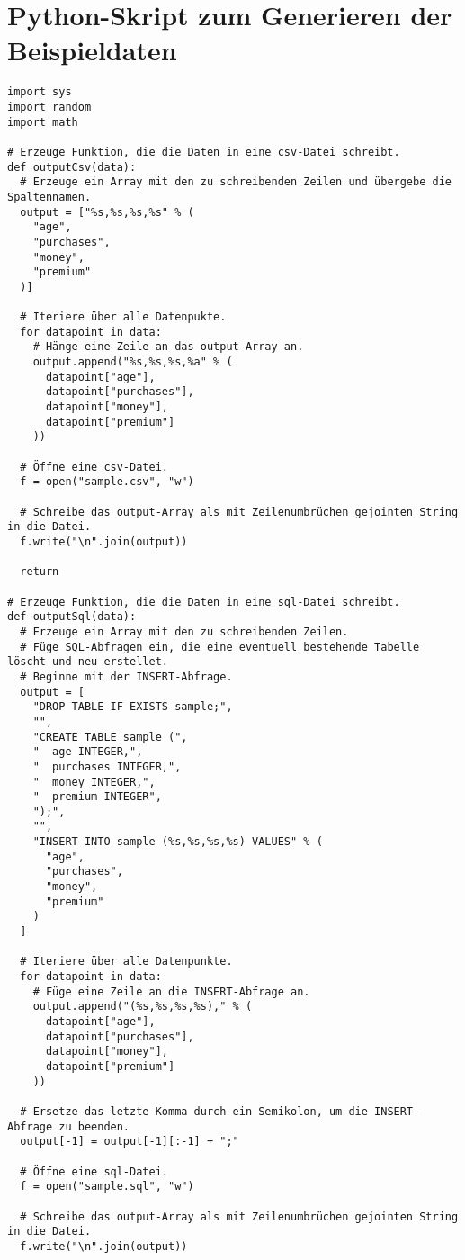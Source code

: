 \chapter{Python-Skript zum Generieren der Beispieldaten}
\label{appendix:A}

\begin{verbatim}
import sys
import random
import math

# Erzeuge Funktion, die die Daten in eine csv-Datei schreibt.
def outputCsv(data):
  # Erzeuge ein Array mit den zu schreibenden Zeilen und übergebe die Spaltennamen.
  output = ["%s,%s,%s,%s" % (
    "age",
    "purchases",
    "money",
    "premium"
  )]

  # Iteriere über alle Datenpukte.
  for datapoint in data:
    # Hänge eine Zeile an das output-Array an.
    output.append("%s,%s,%s,%a" % (
      datapoint["age"],
      datapoint["purchases"],
      datapoint["money"],
      datapoint["premium"]
    ))

  # Öffne eine csv-Datei.
  f = open("sample.csv", "w")

  # Schreibe das output-Array als mit Zeilenumbrüchen gejointen String in die Datei.
  f.write("\n".join(output))

  return

# Erzeuge Funktion, die die Daten in eine sql-Datei schreibt.
def outputSql(data):
  # Erzeuge ein Array mit den zu schreibenden Zeilen.
  # Füge SQL-Abfragen ein, die eine eventuell bestehende Tabelle löscht und neu erstellet.
  # Beginne mit der INSERT-Abfrage.
  output = [
    "DROP TABLE IF EXISTS sample;",
    "",
    "CREATE TABLE sample (",
    "  age INTEGER,",
    "  purchases INTEGER,",
    "  money INTEGER,",
    "  premium INTEGER",
    ");",
    "",
    "INSERT INTO sample (%s,%s,%s,%s) VALUES" % (
      "age",
      "purchases",
      "money",
      "premium"
    )
  ]

  # Iteriere über alle Datenpunkte.
  for datapoint in data:
    # Füge eine Zeile an die INSERT-Abfrage an.
    output.append("(%s,%s,%s,%s)," % (
      datapoint["age"],
      datapoint["purchases"],
      datapoint["money"],
      datapoint["premium"]
    ))

  # Ersetze das letzte Komma durch ein Semikolon, um die INSERT-Abfrage zu beenden.
  output[-1] = output[-1][:-1] + ";"

  # Öffne eine sql-Datei.
  f = open("sample.sql", "w")

  # Schreibe das output-Array als mit Zeilenumbrüchen gejointen String in die Datei.
  f.write("\n".join(output))


\end{verbatim}
